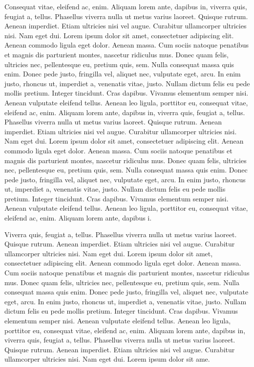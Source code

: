 \documentclass[
    12pt,
    letterpaper,
    oneside,
    noraggedright
]{turabian-researchpaper}
\begin{document}
Consequat vitae, eleifend ac, enim. Aliquam lorem ante, dapibus in,
viverra quis, feugiat a, tellus. Phasellus viverra nulla ut metus varius
laoreet. Quisque rutrum. Aenean imperdiet. Etiam ultricies nisi vel
augue. Curabitur ullamcorper ultricies nisi. Nam eget dui. Lorem ipsum
dolor sit amet, consectetuer adipiscing elit. Aenean commodo ligula eget
dolor. Aenean massa. Cum sociis natoque penatibus et magnis dis
parturient montes, nascetur ridiculus mus. Donec quam felis, ultricies
nec, pellentesque eu, pretium quis, sem. Nulla consequat massa quis
enim. Donec pede justo, fringilla vel, aliquet nec, vulputate eget,
arcu. In enim justo, rhoncus ut, imperdiet a, venenatis vitae, justo.
Nullam dictum felis eu pede mollis pretium. Integer tincidunt. Cras
dapibus. Vivamus elementum semper nisi. Aenean vulputate eleifend
tellus. Aenean leo ligula, porttitor eu, consequat vitae, eleifend ac,
enim. Aliquam lorem ante, dapibus in, viverra quis, feugiat a, tellus.
Phasellus viverra nulla ut metus varius laoreet. Quisque rutrum. Aenean
imperdiet. Etiam ultricies nisi vel augue. Curabitur ullamcorper
ultricies nisi. Nam eget dui. Lorem ipsum dolor sit amet, consectetuer
adipiscing elit. Aenean commodo ligula eget dolor. Aenean massa. Cum
sociis natoque penatibus et magnis dis parturient montes, nascetur
ridiculus mus. Donec quam felis, ultricies nec, pellentesque eu, pretium
quis, sem. Nulla consequat massa quis enim. Donec pede justo, fringilla
vel, aliquet nec, vulputate eget, arcu. In enim justo, rhoncus ut,
imperdiet a, venenatis vitae, justo. Nullam dictum felis eu pede mollis
pretium. Integer tincidunt. Cras dapibus. Vivamus elementum semper nisi.
Aenean vulputate eleifend tellus. Aenean leo ligula, porttitor eu,
consequat vitae, eleifend ac, enim. Aliquam lorem ante, dapibus i.

Viverra quis, feugiat a, tellus. Phasellus viverra nulla ut metus varius
laoreet. Quisque rutrum. Aenean imperdiet. Etiam ultricies nisi vel
augue. Curabitur ullamcorper ultricies nisi. Nam eget dui. Lorem ipsum
dolor sit amet, consectetuer adipiscing elit. Aenean commodo ligula eget
dolor. Aenean massa. Cum sociis natoque penatibus et magnis dis
parturient montes, nascetur ridiculus mus. Donec quam felis, ultricies
nec, pellentesque eu, pretium quis, sem. Nulla consequat massa quis
enim. Donec pede justo, fringilla vel, aliquet nec, vulputate eget,
arcu. In enim justo, rhoncus ut, imperdiet a, venenatis vitae, justo.
Nullam dictum felis eu pede mollis pretium. Integer tincidunt. Cras
dapibus. Vivamus elementum semper nisi. Aenean vulputate eleifend
tellus. Aenean leo ligula, porttitor eu, consequat vitae, eleifend ac,
enim. Aliquam lorem ante, dapibus in, viverra quis, feugiat a, tellus.
Phasellus viverra nulla ut metus varius laoreet. Quisque rutrum. Aenean
imperdiet. Etiam ultricies nisi vel augue. Curabitur ullamcorper
ultricies nisi. Nam eget dui. Lorem ipsum dolor sit ame.
\end{document}
